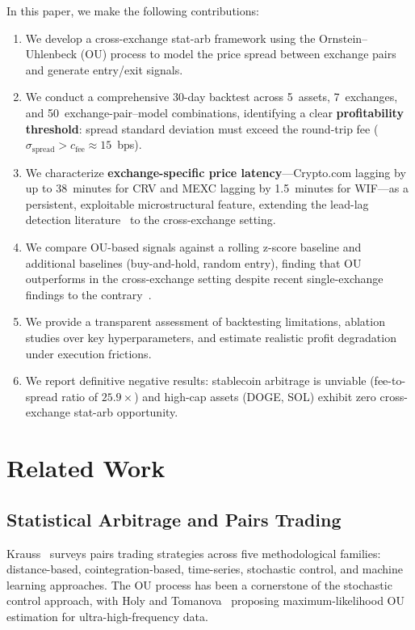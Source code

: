 \documentclass[sigconf,nonacm=false]{acmart}
\begin{document}
In this paper, we make the following contributions:
\begin{enumerate}
    \item We develop a cross-exchange stat-arb framework using the Ornstein--Uhlenbeck (OU) process to model the price spread between exchange pairs and generate entry/exit signals.
    \item We conduct a comprehensive 30-day backtest across 5~assets, 7~exchanges, and 50~exchange-pair--model combinations, identifying a clear \textbf{profitability threshold}: spread standard deviation must exceed the round-trip fee ($\sigma_{\text{spread}} > c_{\text{fee}} \approx 15$~bps).
    \item We characterize \textbf{exchange-specific price latency}---Crypto.com lagging by up to 38~minutes for CRV and MEXC lagging by 1.5~minutes for WIF---as a persistent, exploitable microstructural feature, extending the lead-lag detection literature~\cite{zhang2023dtw, shi2023multireference} to the cross-exchange setting.
    \item We compare OU-based signals against a rolling z-score baseline and additional baselines (buy-and-hold, random entry), finding that OU outperforms in the cross-exchange setting despite recent single-exchange findings to the contrary~\cite{suchato2024application}.
    \item We provide a transparent assessment of backtesting limitations, ablation studies over key hyperparameters, and estimate realistic profit degradation under execution frictions.
    \item We report definitive negative results: stablecoin arbitrage is unviable (fee-to-spread ratio of $25.9\times$) and high-cap assets (DOGE, SOL) exhibit zero cross-exchange stat-arb opportunity.
\end{enumerate}

\section{Related Work}\label{sec:related}

\subsection{Statistical Arbitrage and Pairs Trading}

Krauss~\cite{krauss2017statistical} surveys pairs trading strategies across five methodological families: distance-based, cointegration-based, time-series, stochastic control, and machine learning approaches. The OU process has been a cornerstone of the stochastic control approach, with Holy and Tomanova~\cite{holy2018estimation} proposing maximum-likelihood OU estimation for ultra-high-frequency data.
\end{document}
